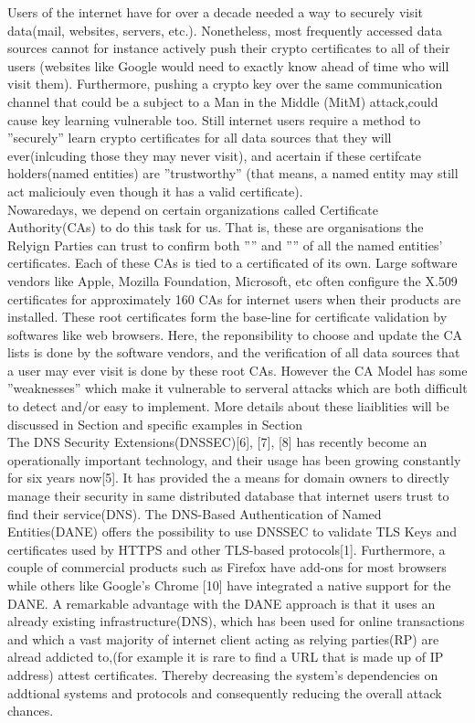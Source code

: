 Users of the internet have for over a decade needed a way to securely visit data(mail, websites, servers, etc.). Nonetheless, most frequently accessed data sources cannot for instance actively push their crypto certificates to all of their users (websites like Google would need to exactly know ahead of time who will visit them). Furthermore, pushing a crypto key over the same communication channel that could be a subject to a Man in the Middle (MitM) attack,could cause key learning  vulnerable too. Still internet users require a method to ''securely'' learn crypto certificates for all data sources that they will ever(inlcuding those they may never visit), and acertain if these certifcate holders(named entities) are ''trustworthy'' (that means, a named entity  may still act maliciouly even though it has a valid certificate).\\
\indent Nowaredays, we depend on certain organizations called Certificate Authority(CAs) to do this task  for us. That is, these are organisations the Relyign Parties can trust to confirm both '''' and '''' of all the named entities' certificates. Each of these CAs  is tied to a certificated of its own. Large software vendors like Apple, Mozilla Foundation, Microsoft, etc often configure  the X.509 certificates for approximately 160 CAs for internet users when their products are installed. These root certificates form the base-line for certificate validation by softwares like web browsers. Here, the reponsibility to choose and update the CA lists is done by the software vendors, and the verification of all data sources that a user may ever visit is done by these root CAs. However the CA Model has some ''weaknesses'' which make it vulnerable to serveral  attacks which are both difficult to detect and/or easy to implement. More details about these liaiblities will be discussed in Section  and specific examples in Section \\
\indent The DNS Security Extensions(DNSSEC)[6], [7], [8] has recently become an operationally important technology, and their usage has been growing constantly  for six years now[5]. It has provided the a means for domain owners  to directly manage their security in same distributed database that internet users trust to find their service(DNS). The DNS-Based Authentication of Named Entities(DANE) offers the possibility to use DNSSEC to validate TLS Keys and certificates used by HTTPS and other TLS-based protocols[1]. Furthermore, a couple of commercial products such as Firefox have  add-ons for most browsers while others like Google's Chrome [10] have integrated a native support for the DANE. A remarkable advantage with the DANE approach is that it uses an already existing infrastructure(DNS), which has been used for online transactions and which a vast majority of internet client acting as relying parties(RP) are alread addicted to,(for example it is rare to find a URL that is made up of IP address) attest certificates. Thereby decreasing the system's dependencies on addtional systems  and protocols and consequently reducing the overall attack chances.\\
